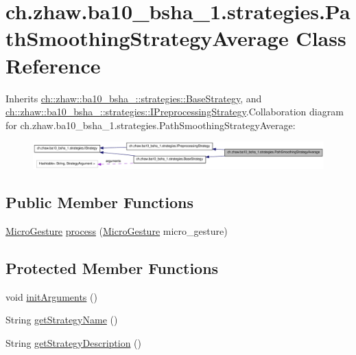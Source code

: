 \hypertarget{classch_1_1zhaw_1_1ba10__bsha__1_1_1strategies_1_1PathSmoothingStrategyAverage}{
\section{ch.zhaw.ba10\_\-bsha\_\-1.strategies.PathSmoothingStrategyAverage Class Reference}
\label{classch_1_1zhaw_1_1ba10__bsha__1_1_1strategies_1_1PathSmoothingStrategyAverage}
}


Inherits \hyperlink{classch_1_1zhaw_1_1ba10__bsha__1_1_1strategies_1_1BaseStrategy}{ch::zhaw::ba10\_\-bsha\_::strategies::BaseStrategy}, and \hyperlink{interfacech_1_1zhaw_1_1ba10__bsha__1_1_1strategies_1_1IPreprocessingStrategy}{ch::zhaw::ba10\_\-bsha\_::strategies::IPreprocessingStrategy}.Collaboration diagram for ch.zhaw.ba10\_\-bsha\_\-1.strategies.PathSmoothingStrategyAverage:\nopagebreak
\begin{figure}[H]
\begin{center}
\leavevmode
\includegraphics[width=400pt]{classch_1_1zhaw_1_1ba10__bsha__1_1_1strategies_1_1PathSmoothingStrategyAverage__coll__graph}
\end{center}
\end{figure}
\subsection*{Public Member Functions}
\begin{DoxyCompactItemize}
\item 
\hyperlink{classch_1_1zhaw_1_1ba10__bsha__1_1_1service_1_1MicroGesture}{MicroGesture} \hyperlink{classch_1_1zhaw_1_1ba10__bsha__1_1_1strategies_1_1PathSmoothingStrategyAverage_a1f021ea53245e6ebfa044ca3bb8b0210}{process} (\hyperlink{classch_1_1zhaw_1_1ba10__bsha__1_1_1service_1_1MicroGesture}{MicroGesture} micro\_\-gesture)
\end{DoxyCompactItemize}
\subsection*{Protected Member Functions}
\begin{DoxyCompactItemize}
\item 
void \hyperlink{classch_1_1zhaw_1_1ba10__bsha__1_1_1strategies_1_1PathSmoothingStrategyAverage_ac9f904cba7b0ae18e9e6b0d6caefeac9}{initArguments} ()
\item 
String \hyperlink{classch_1_1zhaw_1_1ba10__bsha__1_1_1strategies_1_1PathSmoothingStrategyAverage_a3f53ea1550d9fd947e54fab6150b6ed9}{getStrategyName} ()
\item 
String \hyperlink{classch_1_1zhaw_1_1ba10__bsha__1_1_1strategies_1_1PathSmoothingStrategyAverage_a153e28cad8f65a4477594ee20598d3cf}{getStrategyDescription} ()
\end{DoxyCompactItemize}


